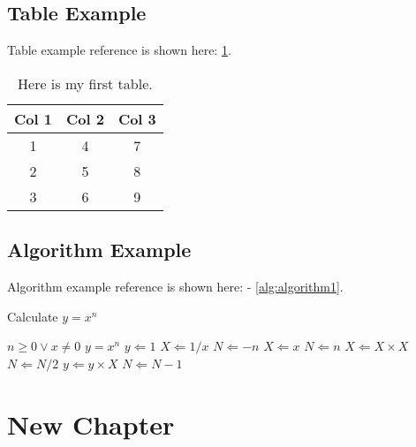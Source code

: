 \documentclass[12pt]{book}
\begin{document}
\newpage
\section{Table Example}

\noindent Table example reference is shown here: \cref{tab:mytable}.

\begin{table}[h!]
  \centering
  \begin{tabular}{ccc}
  \hline
  \textbf{Col 1} & \textbf{Col 2} & \textbf{Col 3} \\ \hline
  1              & 4              & 7              \\ \hline
  2              & 5              & 8              \\ \hline
  3              & 6              & 9              \\ \hline
  \end{tabular}
  \caption{Here is my first table.}
  \label{tab:mytable}
\end{table}

\newpage
\section{Algorithm Example}

\noindent Algorithm example reference is shown here: - \cref{alg:algorithm1}. 

\begin{algorithm} %
  \caption{Calculate $y = x^n$} %
  \label{alg:algorithm1} %
  \begin{algorithmic} %
      \REQUIRE $n \geq 0 \vee x \neq 0$
      \ENSURE $y = x^n$
      \STATE $y \Leftarrow 1$
          \STATE $X \Leftarrow 1 / x$
          \STATE $N \Leftarrow -n$
      \ELSE
          \STATE $X \Leftarrow x$
          \STATE $N \Leftarrow n$
      \ENDIF
              \STATE $X \Leftarrow X \times X$
              \STATE $N \Leftarrow N / 2$
          \ELSE[$N$ is odd]
              \STATE $y \Leftarrow y \times X$
              \STATE $N \Leftarrow N - 1$
          \ENDIF
      \ENDWHILE
  \end{algorithmic}
\end{algorithm}

\chapter{New Chapter}
\end{document}
